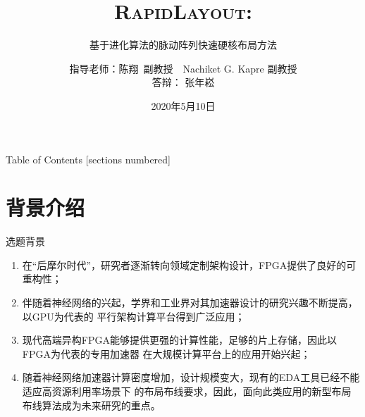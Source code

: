 \documentclass[10pt]{beamer}
\title{\textsc{RapidLayout}:}
\subtitle{基于进化算法的脉动阵列快速硬核布局方法}
\date{2020年5月10日}
\author{指导老师：陈翔\ 副教授\ \ Nachiket G. Kapre 副教授 \\ 答辩：\hspace{0.55cm} 张年崧}
\institute{中山大学 电子与信息工程学院 通信工程专业}
\begin{document}
\maketitle

\begin{frame}{Table of Contents}
  [sections numbered]
  \tableofcontents[hideallsubsections]
\end{frame}


\section{背景介绍}

\begin{frame}{选题背景}

  \begin{enumerate}
    \setlength\itemsep{1.5em}
    \item 在“后摩尔时代”，研究者逐渐转向领域定制架构设计，FPGA提供了良好的可重构性；
    \item 伴随着神经网络的兴起，学界和工业界对其加速器设计的研究兴趣不断提高，以GPU为代表的
    平行架构计算平台得到广泛应用；
    \item 现代高端异构FPGA能够提供更强的计算性能，足够的片上存储，因此以FPGA为代表的专用加速器
    在大规模计算平台上的应用开始兴起；
    \item 随着神经网络加速器计算密度增加，设计规模变大，现有的EDA工具已经不能适应高资源利用率场景下
    的布局布线要求，因此，面向此类应用的新型布局布线算法成为未来研究的重点。
  \end{enumerate} 

\end{frame}  
\end{document}
